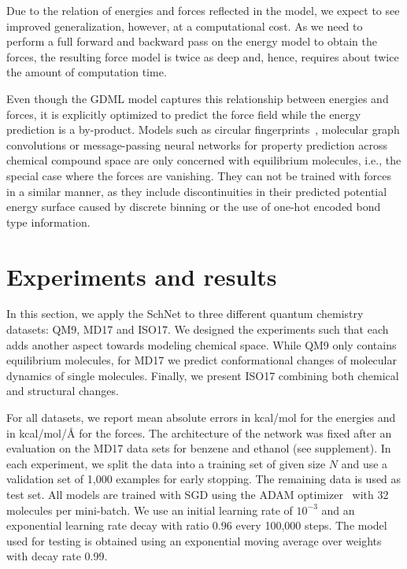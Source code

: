\documentclass{article}
\begin{document}
Due to the relation of energies and forces reflected in the model, we expect to see improved generalization, however, at a computational cost.
As we need to perform a full forward and backward pass on the energy model to obtain the forces, the resulting force model is twice as deep and, hence, requires about twice the amount of computation time.

Even though the GDML model captures this relationship between energies and forces, it is explicitly optimized to predict the force field while the energy prediction is a by-product.
Models such as circular fingerprints~\citep{duvenaud2015convolutional}, molecular graph convolutions or message-passing neural networks\citep{gilmer2017neural} for property prediction across chemical compound space are only concerned with equilibrium molecules, i.e., the special case where the forces are vanishing.
They can not be trained with forces in a similar manner, as they include discontinuities in their predicted potential energy surface caused by discrete binning or the use of one-hot encoded bond type information.

\section{Experiments and results}
In this section, we apply the SchNet to three different quantum chemistry datasets: QM9, MD17 and ISO17.
We designed the experiments such that each adds another aspect towards modeling chemical space.
While QM9 only contains equilibrium molecules, for MD17 we predict conformational changes of molecular dynamics of single molecules.
Finally, we present ISO17 combining both chemical and structural changes.

For all datasets, we report mean absolute errors in kcal/mol for the energies and in kcal/mol/{\AA} for the forces. The architecture of the network was fixed after an evaluation on the MD17 data sets for benzene and ethanol (see supplement).
In each experiment, we split the data into a training set of given size $N$ and use a validation set of 1,000 examples for early stopping. The remaining data is used as test set.
All models are trained with SGD using the ADAM optimizer~\citep{KingmaB14} with 32 molecules per mini-batch.
We use an initial learning rate of $10^{-3}$ and an exponential learning rate decay with ratio $0.96$ every 100,000 steps. The model used for testing is obtained using an exponential moving average over weights with decay rate 0.99.
\end{document}
